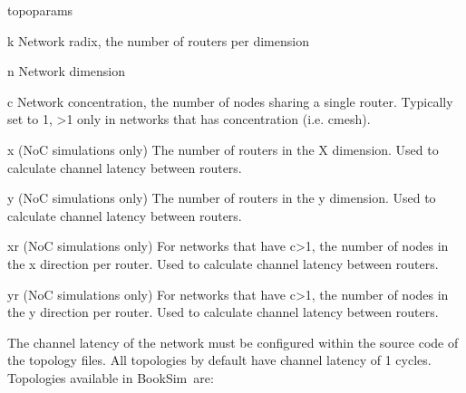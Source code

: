 \documentclass[11pt]{article}
\newcommand{\simname}{BookSim~}
\begin{document}
\begin{opt_list}{topoparams}

\item[k] Network radix, the number of routers per dimension
\item[n] Network dimension
\item[c] Network concentration, the number of nodes sharing a single
  router. Typically set to 1, >1 only in networks that has
  concentration (i.e. cmesh).
\item[x] (NoC simulations only) The number of routers in the X
  dimension. Used to calculate channel latency between routers.  
\item[y] (NoC simulations only) The number of routers in the y
  dimension. Used to calculate channel latency between routers.  
\item[xr] (NoC simulations only) For networks that have c>1, the
  number of nodes in the x direction per router. Used to calculate
  channel latency between routers.  
\item[yr] (NoC simulations only) For networks that have c>1, the
  number of nodes in the y direction per router. Used to calculate
  channel latency between routers.  

\end{opt_list}


The channel latency of the network must be configured within the
source code of the topology files. All topologies by default have
channel latency of 1 cycles. Topologies available in \simname are: 
\end{document}

